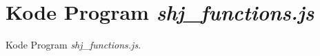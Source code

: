\chapter{Kode Program \textit{shj\_functions.js}}
\label{lamp:kodeprogramshjfunc}

Kode Program \textit{shj\_functions.js}.
 